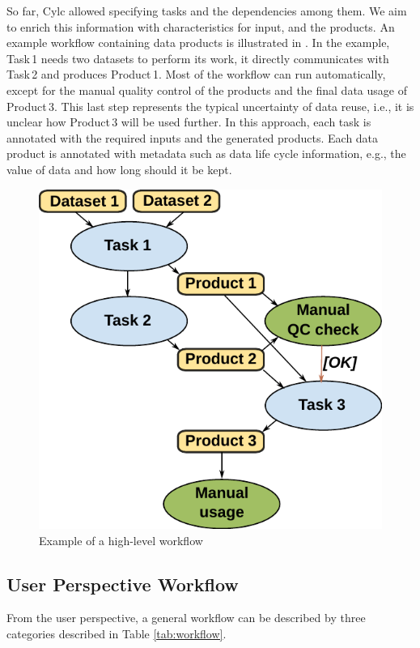 \documentclass[a4paper]{article}
\begin{document}
So far, Cylc allowed specifying tasks and the dependencies among them.
We aim to enrich this information with characteristics for input, and the products. {\color{cyan}{What?!}}
An example workflow containing data products is illustrated in .
\sout{{\color{blue}{Arrows indicate dependencies between nodes that represent tasks and data.}}}
{\color{cyan}{Nodes represent tasks and data and arrows indicate dependencies among tasks.}}
In the example, Task\,1 needs two datasets to perform its work, it directly communicates with Task\,2 and produces Product\,1.
Most of the workflow can run automatically, except for the manual quality control of the products and the final data usage of Product\,3.
This last step represents the typical uncertainty of data reuse, i.e., it is unclear how Product\,3 will be used further.
In this approach, each task is annotated with the required inputs and the generated products.
Each data product is annotated with metadata such as data life cycle information, e.g., the value of data and how long should it be kept.

\begin{figure}[H]
  \centering
  \includegraphics[width=0.4\columnwidth]{workflow}
  \caption{Example of a high-level workflow}
  \label{fig:workflow}
\end{figure}

\subsection{User Perspective Workflow}

From the user perspective, a general workflow can be described by three categories described in Table \ref{tab:workflow}.
\end{document}
